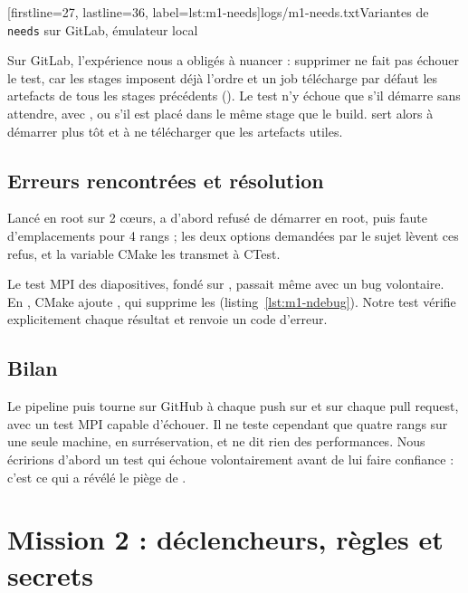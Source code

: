 \documentclass[11pt,a4paper]{article}
\newcommand{\fic}[1]{\code{#1}}
\newcommand{\preuve}[3][]{}
\begin{document}
  [firstline=27, lastline=36, label=lst:m1-needs]{logs/m1-needs.txt}{Variantes de \texttt{needs} sur GitLab, émulateur local}

Sur GitLab, l'expérience nous a obligés à nuancer : supprimer  ne fait pas échouer le
test, car les stages imposent déjà l'ordre et un job télécharge par défaut les artefacts de tous
les stages précédents (\fic{logs/m1-needs.txt}). Le test n'y échoue que s'il démarre sans
attendre, avec , ou s'il est placé dans le même stage que le build. 
sert alors à démarrer plus tôt et à ne télécharger que les artefacts utiles.

\subsection{Erreurs rencontrées et résolution}\label{sec:m1-erreurs}

Lancé en root sur 2 cœurs,  a d'abord refusé de démarrer en root, puis faute
d'emplacements pour 4 rangs ; les deux options demandées par le sujet lèvent ces refus, et la
variable CMake  les transmet à CTest.

Le test MPI des diapositives, fondé sur , passait même avec un bug volontaire. En
, CMake ajoute , qui supprime les  (listing~\ref{lst:m1-ndebug}).
Notre test vérifie explicitement chaque résultat et renvoie un code d'erreur.

\preuve[label=lst:m1-ndebug]{logs/m1-ndebug.txt}{Test des diapositives avec un bug volontaire, sans puis avec
\texttt{-DNDEBUG}}

\subsection{Bilan}

Le pipeline  puis  tourne sur GitHub à chaque push sur  et sur
chaque pull request, avec un test MPI capable d'échouer. Il ne teste cependant que quatre rangs
sur une seule machine, en surréservation, et ne dit rien des performances. Nous écririons
d'abord un test qui échoue volontairement avant de lui faire confiance : c'est ce qui a révélé le
piège de .

\section{Mission 2 : déclencheurs, règles et secrets}
\end{document}
